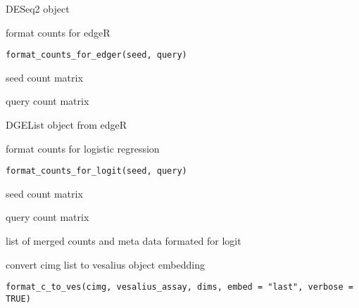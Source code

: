 \documentclass[a4paper]{book}
\begin{document}
%
\begin{Value}
DESeq2 object
\end{Value}
%
\begin{Description}
format counts for edgeR
\end{Description}
%
\begin{Usage}
\begin{verbatim}
format_counts_for_edger(seed, query)
\end{verbatim}
\end{Usage}
%
\begin{Arguments}
\begin{ldescription}
\item[\code{seed}] seed count matrix

\item[\code{query}] query count matrix
\end{ldescription}
\end{Arguments}
%
\begin{Value}
DGEList object from edgeR
\end{Value}
%
\begin{Description}
format counts for logistic regression
\end{Description}
%
\begin{Usage}
\begin{verbatim}
format_counts_for_logit(seed, query)
\end{verbatim}
\end{Usage}
%
\begin{Arguments}
\begin{ldescription}
\item[\code{seed}] seed count matrix

\item[\code{query}] query count matrix
\end{ldescription}
\end{Arguments}
%
\begin{Value}
list of merged counts and meta data formated for logit
\end{Value}
%
\begin{Description}
convert cimg list to vesalius object embedding
\end{Description}
%
\begin{Usage}
\begin{verbatim}
format_c_to_ves(cimg, vesalius_assay, dims, embed = "last", verbose = TRUE)
\end{verbatim}
\end{Usage}
\end{document}
